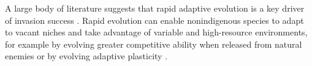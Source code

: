 \documentclass[12pt]{article}\usepackage[]{graphicx}\usepackage[]{color}
\begin{document}
	A large body of literature suggests that rapid adaptive evolution is a key driver of invasion success  \parencite[e.g.,][]{Reznick2001, Prentis2008,Colautti2015,Lee2002invasion,Clements2011}.  Rapid evolution can enable nonindigenous species to adapt to vacant niches and take advantage of variable and high-resource environments, for example by evolving greater competitive ability  when released from natural enemies \parencite{Blossey1995,Bossdorf2005} or by evolving adaptive plasticity \parencite{Richards2006}. %
	
\end{document}
